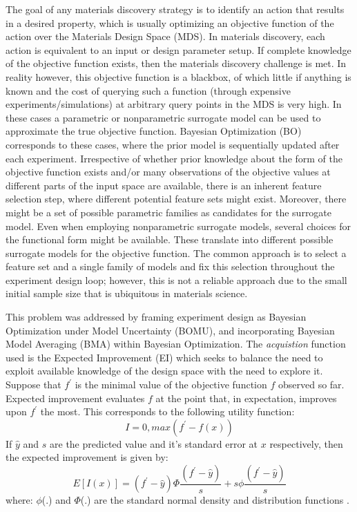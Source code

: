 \documentclass[utf8]{frontiersSCNS} %
\begin{document}
The goal of any materials discovery strategy  is to identify an action that results in a desired property, which is usually optimizing an objective function of the action over the Materials Design Space (MDS).  In materials discovery, each action is equivalent to an input or design parameter setup. If complete knowledge of the objective function exists, then the materials discovery challenge is met. In reality however, this objective function is a blackbox, of which little if anything is known and the cost of querying such a function (through expensive experiments/simulations) at arbitrary query points in the MDS is very high. In these cases a parametric or nonparametric surrogate model can be used to approximate the true objective function. Bayesian Optimization (BO) \cite{shahriari2016taking}  corresponds to these cases, where the prior model is sequentially updated after each experiment. 
Irrespective of whether prior knowledge about the form of the objective function exists and/or many observations of the objective values at different parts of the input space are available, there is an inherent feature selection step, where different potential feature sets might exist. Moreover, there might be a set of possible parametric families as candidates for the surrogate model. Even when employing nonparametric surrogate models, several choices for the functional form might be available. These translate into different possible surrogate models for the objective function. The common approach is to select a feature set and a single family of models and fix this selection throughout the experiment design loop; however, this is not a reliable approach due to the small initial sample size that is ubiquitous in materials science. 

This problem was addressed by framing experiment design as Bayesian Optimization under Model Uncertainty (BOMU), and incorporating Bayesian Model Averaging (BMA) within Bayesian Optimization.  The \textit{acquistion} function used is the Expected Improvement (EI) which seeks to balance the need to exploit available knowledge of the design space with the need to explore it. Suppose that $f^\prime$ is the minimal value of the objective function $f$ observed so far. Expected improvement evaluates $f$ at the point that, in expectation, improves upon $f^\prime$ the most. This corresponds to the following utility function:
\begin{equation}
I = 0, max(f^\prime - f(x))
 \end{equation}
If $\hat{y}$ and $s$ are the predicted value and it's standard error at $x$ respectively, then the expected improvement is given by:
\begin{equation}
E[I(x)] = (f^\prime - \hat{y}) \Phi \frac{(f^\prime - \hat{y})}{s} + s \phi \frac{(f^\prime - \hat{y})}{s}
\end{equation}
where: $\phi$(.) and $\Phi$(.) are the standard normal density and distribution functions \cite{jones1998efficient}. 
\end{document}

